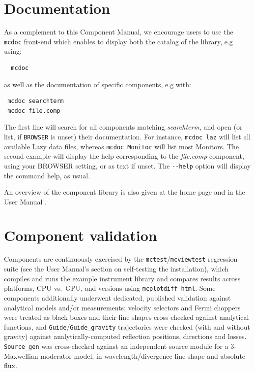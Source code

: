 \section{Documentation}
As a complement to this Component Manual, we encourage users to use
the \verb+mcdoc+ front-end which enables to display both the
catalog of the \MCS library, e.g using: 
\begin{lstlisting}
  mcdoc
\end{lstlisting}
as well as the documentation of specific components, e.g with:
\begin{lstlisting}
 mcdoc searchterm
 mcdoc file.comp
\end{lstlisting}
The first line will search for all components matching \textit{searchterm},
and open (or list, if \texttt{BROWSER} is unset) their documentation. For instance, \verb+mcdoc laz+ will list all available Lazy data files, whereas \verb+mcdoc Monitor+ will list most Monitors.
The second example will display the help corresponding to
the \textit{file.comp} component, using your
BROWSER setting, or as text if unset.
The \verb+--help+ option will display the command help, as usual.

An overview of the component library is also given at the \MCS home page \cite{mcstas_webpage} and in the User Manual \cite{mcstasmanual}.

\section{Component validation}

Components are continuously exercised by the \texttt{mctest}/\texttt{mcviewtest}
regression suite (see the User Manual's section on self-testing the
installation), which
compiles and runs the example instrument library and compares results
across platforms, CPU vs.\ GPU, and \MCS versions using \texttt{mcplotdiff-html}.
Some components additionally underwent dedicated, published validation
against analytical models and/or measurements; velocity selectors and Fermi
choppers were treated as black boxes and their line shapes cross-checked
against analytical functions, and \texttt{Guide}/\texttt{Guide\_gravity}
trajectories were checked (with and without gravity) against
analytically-computed reflection positions, directions and losses.
\texttt{Source\_gen} was cross-checked against an independent source module
for a 3-Maxwellian moderator model, in wavelength/divergence line shape and
absolute flux.

